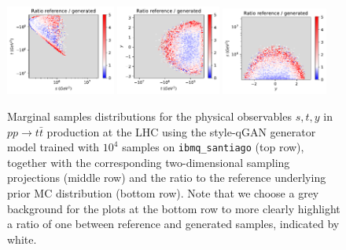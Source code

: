 \documentclass[twocolumn,preprintnumbers,superscriptaddress]{revtex4-2}
\begin{document}
\begin{figure}
  \includegraphics[width=0.32\textwidth]{plots/hardware/ibm_santiago/s-t_RATIO_IBM_100k.pdf}%
  \includegraphics[width=0.305\textwidth]{plots/hardware/ibm_santiago/t-y_RATIO_IBM_100k.pdf}%
  \includegraphics[width=0.31\textwidth]{plots/hardware/ibm_santiago/y-s_RATIO_IBM_100k.pdf}

  \caption{\label{fig:ibm}
    Marginal samples distributions for the physical observables $s,t,y$
    in $pp\rightarrow t\bar{t}$ production at the LHC using the style-qGAN generator model trained
    with $10^4$ samples on {\tt ibmq\_santiago} (top row), together with the corresponding
    two-dimensional sampling projections (middle row) and the ratio to the reference underlying
    prior MC distribution (bottom row). Note that we choose
    a grey background for the plots at the bottom row to more clearly highlight a ratio of one between reference and generated samples, indicated by white.}
\end{figure}
\end{document}
